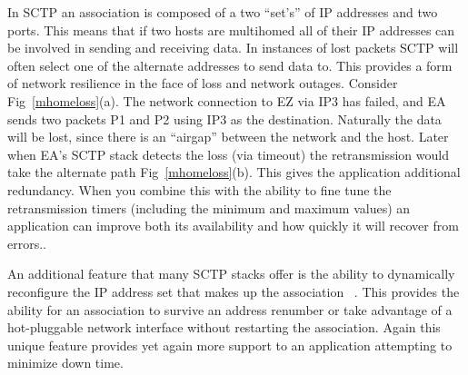 \documentclass[conference]{IEEEtran}
\begin{document}
In SCTP an association is composed of a two ``set's'' of IP addresses and two ports. This
means that if two hosts are multihomed all of their IP addresses can be involved
in sending and receiving data. In instances of lost packets SCTP will often select
one of the alternate addresses to send data to. This provides a form of network 
resilience in the face of loss and network outages. Consider Fig~\ref{mhomeloss}(a).
The network connection to EZ via IP3 has failed, and EA sends two packets P1 and P2 using
IP3 as the destination. Naturally the data will be lost, since there is an ``airgap''
between the network and the host. Later when EA's SCTP stack detects the loss (via timeout)
the retransmission would take the alternate path Fig~\ref{mhomeloss}(b). This gives
the application additional redundancy. When you combine this with the ability to fine tune
the retransmission timers (including the minimum and maximum values) an 
application can improve both its availability and how quickly it will recover from
errors..

An additional feature that many SCTP stacks offer is the ability to dynamically 
reconfigure the IP address set that makes up the association ~\cite{rfc5061}. This
provides the ability for an association to survive an address renumber or take
advantage of a hot-pluggable network interface without restarting the 
association. Again this unique feature provides yet again more support 
to an application attempting to minimize down time.
\end{document}
